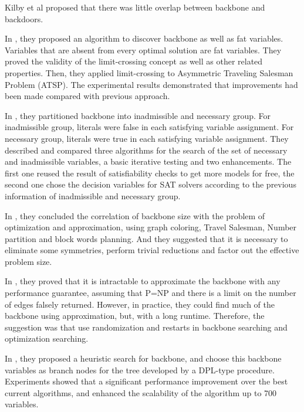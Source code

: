 Kilby et al proposed \cite{KST2005} that there was little overlap between backbone and backdoors.

In \cite{CZW2002}, they proposed an algorithm to discover backbone as well as fat variables. Variables that are absent from every optimal solution are fat variables. They proved the validity of the limit-crossing concept as well as other related properties. Then, they applied limit-crossing to Asymmetric Traveling Salesman Problem (ATSP). The experimental results demonstrated that improvements had been made compared with previous approach. 

In \cite{KKW2001}, they partitioned backbone into inadmissible and necessary group. For inadmissible group, literals were false in each satisfying variable assignment. For necessary group, literals were true in each satisfying variable assignment. They described and compared three algorithms for the search of the set of necessary and inadmissible variables, a basic iterative testing and two enhancements. The first one reused the result of satisfiability checks to get more models for free, the second one chose the decision variables for SAT solvers according to the previous information of inadmissible and necessary group.

In \cite{WS2001}, they concluded the correlation of backbone size with the problem of optimization and approximation, using graph coloring, Travel Salesman, Number partition and block words planning. And they suggested that it is necessary to eliminate some symmetries, perform trivial reductions and factor out the effective problem size.

In \cite{KSW2005}, they proved that it is intractable to approximate the backbone with any performance guarantee, assuming that P=NP and there is a limit on the number of edges falsely returned.
However, in practice, they could find much of the backbone using approximation, but, with a long runtime. Therefore, the suggestion was that use randomization and restarts in backbone searching and optimization searching.

In \cite{DD2001}, they proposed a heuristic search for backbone, and choose this backbone variables as branch nodes for the tree developed by a DPL-type procedure. Experiments showed that a significant performance improvement over the best current algorithms, and enhanced the scalability of the algorithm up to 700 variables.

